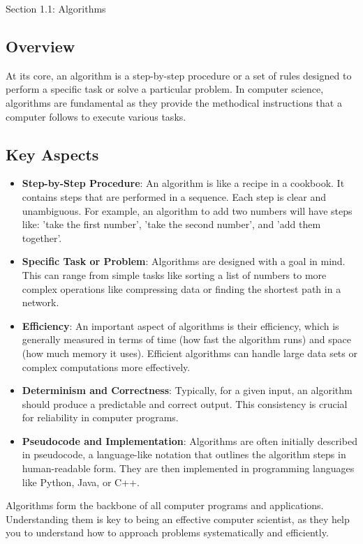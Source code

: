 \begin{notes}{Section 1.1: Algorithms}
    \subsection*{Overview}

    At its core, an algorithm is a step-by-step procedure or a set of rules designed to perform a specific task or solve a particular problem. In computer science, algorithms are fundamental as they 
    provide the methodical instructions that a computer follows to execute various tasks. \vspace*{1em}

    \subsection*{Key Aspects}

    \begin{itemize}
        \item \textbf{Step-by-Step Procedure}: An algorithm is like a recipe in a cookbook. It contains steps that are performed in a sequence. Each step is clear and unambiguous. For example, an algorithm 
        to add two numbers will have steps like: 'take the first number', 'take the second number', and 'add them together'.
        \item \textbf{Specific Task or Problem}: Algorithms are designed with a goal in mind. This can range from simple tasks like sorting a list of numbers to more complex operations like compressing 
        data or finding the shortest path in a network.
        \item \textbf{Efficiency}: An important aspect of algorithms is their efficiency, which is generally measured in terms of time (how fast the algorithm runs) and space (how much memory it uses). 
        Efficient algorithms can handle large data sets or complex computations more effectively.
        \item \textbf{Determinism and Correctness}: Typically, for a given input, an algorithm should produce a predictable and correct output. This consistency is crucial for reliability in computer 
        programs.
        \item \textbf{Pseudocode and Implementation}: Algorithms are often initially described in pseudocode, a language-like notation that outlines the algorithm steps in human-readable form. They are 
        then implemented in programming languages like Python, Java, or C++.
    \end{itemize}

    Algorithms form the backbone of all computer programs and applications. Understanding them is key to being an effective computer scientist, as they help you to understand how to approach problems 
    systematically and efficiently.
\end{notes}

